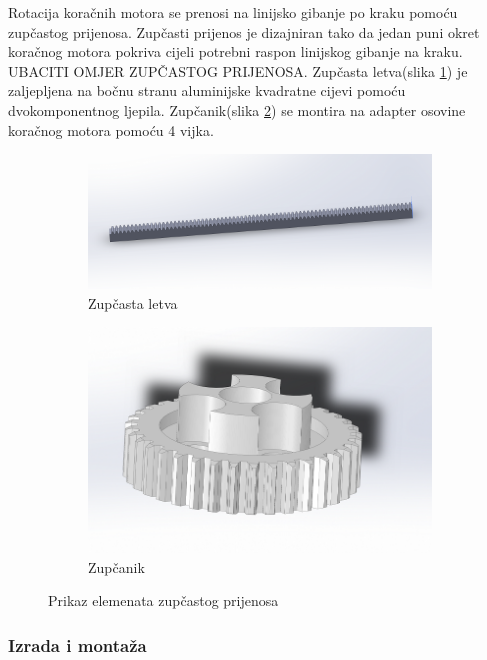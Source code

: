 \documentclass[11pt,a4paper]{article}
\begin{document}
Rotacija koračnih motora se prenosi na linijsko gibanje po kraku pomoću zupčastog prijenosa. Zupčasti prijenos je dizajniran tako da jedan puni okret koračnog motora pokriva cijeli potrebni raspon linijskog gibanje na kraku. UBACITI OMJER ZUPČASTOG PRIJENOSA.
Zupčasta letva(slika \ref{fig:gear_rack}) je zaljepljena na bočnu stranu aluminijske kvadratne cijevi pomoću dvokomponentnog ljepila. Zupčanik(slika \ref{fig:gear_gear}) se montira na adapter osovine koračnog motora pomoću 4 vijka. 



\begin{figure}[H]
\centering
\begin{subfigure}{.5\textwidth}
  \centering
  \includegraphics[width=.9\linewidth]{figures/gear_rack_6mm.png}
  \caption{Zupčasta letva}
  \label{fig:gear_rack}
\end{subfigure}%
\begin{subfigure}{.5\textwidth}
  \centering
  \includegraphics[width=.9\linewidth]{figures/gear_25_07.png}
  \caption{Zupčanik}
  \label{fig:gear_gear}
\end{subfigure}

\caption{Prikaz elemenata zupčastog prijenosa}
\label{fig:gear}
\end{figure}


\subsubsection{Izrada i montaža}
\end{document}

